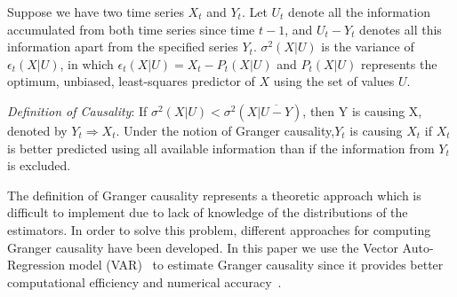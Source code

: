 Suppose we have two time series $X_t$ and $Y_t$. Let $U_t$ denote all the information accumulated from both time series since time $t-1$, and $U_t-Y_t$ denotes all this information apart from the specified series $Y_t$. $\sigma^2(X|U)$ is the variance of $\epsilon_t(X|U)$, in which $\epsilon_t(X|U)=X_t-P_t(X|U)$ and $P_t(X|U)$ represents the optimum, unbiased, least-squares predictor of $X$ using the set of values $U$.

\emph{Definition of Causality}: If $\sigma^2(X|U)<\sigma^2(X|\overline{U-Y})$, then Y is causing X, denoted by $Y_t \Rightarrow X_t$. Under the notion of Granger causality,$Y_t$ is causing $X_t$ if $X_t$ is better predicted using all available information than if the information from $Y_t$ is excluded.

The definition of Granger causality represents a theoretic approach which is difficult to implement due to lack of knowledge of the distributions of the estimators. In order to solve this problem, different approaches for computing Granger causality have been developed. In this paper we use the Vector Auto-Regression model (VAR)~\cite{barnett2014mvgc} to estimate Granger causality since it provides better computational efficiency and numerical accuracy~\cite{barnett2014mvgc}. 

